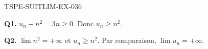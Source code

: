 \begin{corrige}{TSPE-SUITLIM-EX-036}

\textbf{Q1.} $u_n - n^2 = 3n \geq 0$. Donc $u_n \geq n^2$.

\textbf{Q2.} $\lim n^2 = +\infty$ et $u_n \geq n^2$. Par comparaison, $\boxed{\lim u_n = +\infty}$.

\end{corrige}
